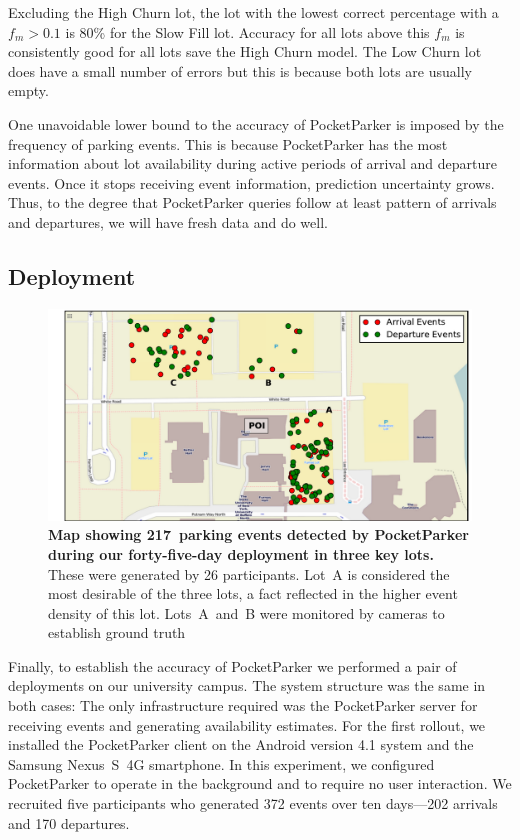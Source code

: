 Excluding the High Churn lot, the lot with the lowest correct percentage with
a $f_m > 0.1$ is 80\% for the Slow Fill lot.  Accuracy for all lots above
this $f_m$ is consistently good for all lots save the High Churn model.  The
Low Churn lot does have a small number of errors but this is because both lots
are usually empty.

One unavoidable lower bound to the accuracy of PocketParker is imposed by the
frequency of parking events.  This is because PocketParker has the most
information about lot availability during active periods of arrival and
departure events. Once it stops receiving event information, prediction
uncertainty grows.  Thus, to the degree that PocketParker queries follow at
least pattern of arrivals and departures, we will have fresh data and do well.

\subsection{Deployment}

\begin{figure}
\centering
\includegraphics[width=\textwidth]{./figures/EventsOnThreeParkingLot.pdf}

\caption{\textbf{Map showing 217~parking events detected by PocketParker
during our forty-five-day deployment in three key lots.}  These were
generated by 26 participants.  Lot~A is considered the most desirable of the
three lots, a fact reflected in the higher event density of this lot.  
Lots~A~and~B were monitored by cameras to establish ground truth}

\label{fig-events}
\end{figure}

Finally, to establish the accuracy of PocketParker we performed a pair of
deployments on our university campus.  The system structure was the same in
both cases:  The only infrastructure required was the PocketParker server for
receiving events and generating availability estimates.  For the first
rollout, we installed the PocketParker client on the Android version 4.1
system and the Samsung Nexus~S~4G smartphone.  In this experiment, we
configured PocketParker to operate in the background and to require no user
interaction.   We recruited five participants who generated 372 events over
ten days---202 arrivals and 170 departures.

